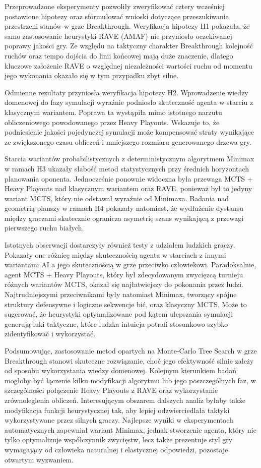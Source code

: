\documentclass{article}
\begin{document}
Przeprowadzone eksperymenty pozwoliły zweryfikować cztery wcześniej postawione hipotezy oraz sformułować wnioski dotyczące przeszukiwania przestrzeni stanów w grze Breakthrough. Weryfikacja hipotezy H1 pokazała, że samo zastosowanie heurystyki RAVE (AMAF) nie przyniosło oczekiwanej poprawy jakości gry. Ze względu na taktyczny charakter Breakthrough kolejność ruchów oraz tempo dojścia do linii końcowej mają duże znaczenie, dlatego kluczowe założenie RAVE o względnej niezależności wartości ruchu od momentu jego wykonania okazało się w tym przypadku zbyt silne.

Odmienne rezultaty przyniosła weryfikacja hipotezy H2. Wprowadzenie wiedzy domenowej do fazy symulacji wyraźnie podniosło skuteczność agenta w starciu z klasycznym wariantem. Poprawa ta wystąpiła mimo istotnego narzutu obliczeniowego powodowanego przez Heavy Playouts. Wskazuje to, że podniesienie jakości pojedynczej symulacji może kompensować straty wynikające ze zwiększonego czasu obliczeń i mniejszego rozmiaru generowanego drzewa gry.

Starcia wariantów probabilistycznych z deterministycznym algorytmem Minimax w ramach H3 ukazały słabość metod statystycznych przy średnich horyzontach planowania oponenta. Jednocześnie ponownie widoczna była przewaga MCTS + Heavy Playouts nad klasycznym wariantem oraz RAVE, ponieważ był to jedyny wariant MCTS, który nie odstawał wyraźnie od Minimaxa. Badania nad geometrią planszy w ramach H4 pokazały natomiast, że wydłużenie dystansu między graczami skutecznie ogranicza asymetrię szans wynikającą z przewagi pierwszego ruchu białych.

Istotnych obserwacji dostarczyły również testy z udziałem ludzkich graczy. Pokazały one różnicę między skutecznością agenta w starciach z innymi wariantami AI a jego skutecznością w grze przeciwko człowiekowi. Paradoksalnie, agent MCTS + Heavy Playouts, który był zdecydowanym zwycięzcą turnieju różnych wariantów MCTS, okazał się najłatwiejszy do pokonania przez ludzi. Najtrudniejszymi przeciwnikami były natomiast Minimax, tworzący spójne struktury defensywne i logiczne sekwencje bić, oraz klasyczny MCTS. Może to sugerować, że heurystyki optymalizowane pod kątem ulepszania symulacji generują luki taktyczne, które ludzka intuicja potrafi stosunkowo szybko zidentyfikować i wykorzystać.

Podsumowując, zastosowanie metod opartych na Monte-Carlo Tree Search w grze Breakthrough stanowi skuteczne rozwiązanie, choć jego efektywność silnie zależy od sposobu wykorzystania wiedzy domenowej. Kolejnym kierunkiem badań mogłoby być łączenie kilku modyfikacji algorytmu lub jego poszczególnych faz, w szczególności połączenie Heavy Playouts z RAVE oraz wykorzystanie zrównoleglenia obliczeń. Interesującym obszarem dalszych analiz byłaby także modyfikacja funkcji heurystycznej tak, aby lepiej odzwierciedlała taktyki wykorzystywane przez silnych graczy. Najlepsze wyniki w eksperymentach automatycznych zapewniał wariant Minimax, jednak stworzenie agenta, który nie tylko optymalizuje współczynnik zwycięstw, lecz także prezentuje styl gry wymagający od człowieka naturalnej i elastycznej odpowiedzi, pozostaje otwartym wyzwaniem.
\end{document}
